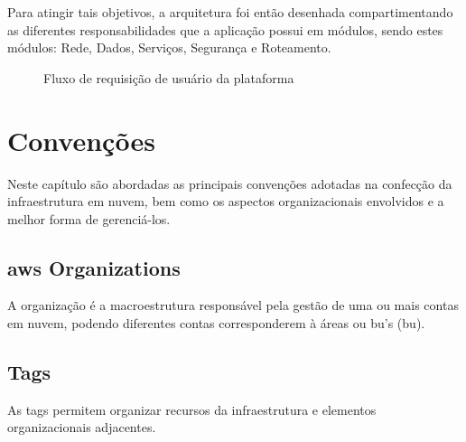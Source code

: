 \documentclass[12pt, a4paper]{report}
\begin{document}
Para atingir tais objetivos, a arquitetura foi então desenhada compartimentando as diferentes responsabilidades que a aplicação possui em módulos, sendo estes módulos: Rede, Dados, Serviços, Segurança e Roteamento.

\begin{center}
	\begin{figure}[H]
		\noindent{}
		\caption{Fluxo de requisição de usuário da plataforma}\label{fig:01-overview}
	\end{figure}
\end{center}

\section{Convenções}

Neste capítulo são abordadas as principais convenções adotadas na confecção da infraestrutura em nuvem, bem como os aspectos organizacionais envolvidos e a melhor forma de gerenciá-los.

\subsection{\acrshort{aws} Organizations}

A organização é a macroestrutura responsável pela gestão de uma ou mais contas em nuvem, podendo diferentes contas corresponderem à áreas ou \acrshort{bu}'s (\acrlong{bu}).

\subsection{Tags}

As tags permitem organizar recursos da infraestrutura e elementos organizacionais adjacentes.
\end{document}
